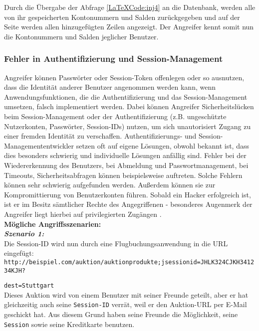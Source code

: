 Durch die Übergabe der Abfrage \ref{LaTeXCode:inj4} an die Datenbank, werden alle von ihr gespeicherten Kontonummern und Salden zurückgegeben und auf der Seite werden allen hinzugefügten Zeilen angezeigt. Der Angreifer kennt somit nun die Kontonummern und Salden jeglicher Benutzer.

\subsubsection{Fehler in Authentifizierung und Session-Management}

Angreifer können Passwörter oder Session-Token offenlegen oder so ausnutzen, dass die Identität anderer Benutzer angenommen werden kann, wenn Anwendungsfunktionen, die die Authentifizierung und das Session-Management umsetzen, falsch implementiert werden. Dabei können Angreifer Sicherheitslücken beim Session-Management oder der Authentifizierung (z.B. ungeschützte Nutzerkonten, Passwörter, Session-IDs) nutzen, um sich unautorisiert Zugang zu einer fremden Identität zu verschaffen. Authentifizierungs- und Session-Managemententwickler setzen oft auf eigene Lösungen, obwohl bekannt ist, dass dies besonders schwierig und individuelle Lösungen anfällig sind. Fehler bei der Wiedererkennung des Benutzers, bei Abmeldung und Passwortmanagement, bei Timeouts, Sicherheitsabfragen können beispielsweise auftreten. Solche Fehlern können sehr schwierig aufgefunden werden. Außerdem können sie zur Kompromittierung von Benutzerkonten führen. Sobald ein Hacker erfolgreich ist, ist er im Besitz sämtlicher Rechte des Angegriffenen - besonderes Augenmerk der Angreifer liegt hierbei auf privilegierten Zugängen \cite{owasp13top10}.\\

\textbf{Mögliche Angriffsszenarien:}\\

\textbf{\textit{Szenario 1:}}\\
Die Session-ID wird nun durch eine Flugbuchungsanwendung   in die URL eingefügt\cite{owasp13top10}:\\


\texttt{http://beispiel.com/auktion/auktionprodukte;jsessionid=JHLK324CJKH341234KJH?}

\texttt{dest=Stuttgart}\\

Dieses Auktion wird von einem Benutzer mit seiner Freunde geteilt, aber er hat gleichzeitig auch seine \texttt{Session-ID} verrät, weil er den Auktion-URL per E-Mail geschickt hat. Aus diesem Grund  haben seine Freunde die Möglichkeit, seine \texttt{Session} sowie seine Kreditkarte benutzen.\\

